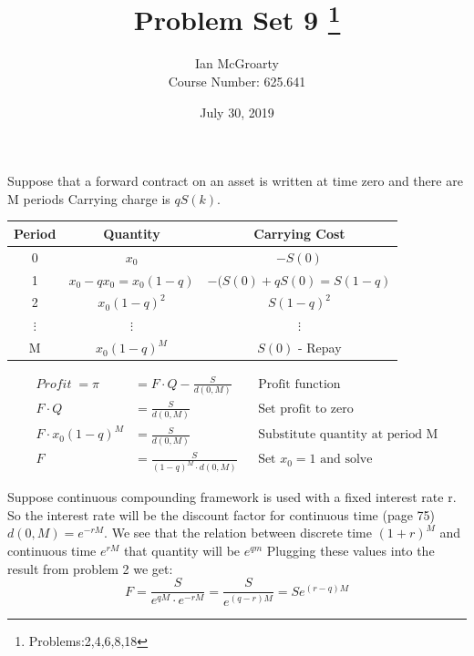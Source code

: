 \documentclass[12pt]{article}
\title{Problem Set 9 \thanks{Problems:2,4,6,8,18}}
\author{Ian McGroarty \\
	Course Number: 625.641}
\date{July 30, 2019}
\newenvironment{problem}[3][Problem]{\begin{trivlist}
\item[\hskip \labelsep {\bfseries #1}\hskip \labelsep {\bfseries #2.}]}{\end{trivlist}}
\begin{document}
\maketitle
\newpage
\begin{problem}{2 (Proportional Carrying Charges)}. Suppose that a forward contract on an asset is written at time zero and there are M periods Carrying charge is $qS(k)$. 
\begin{center}
\begin{tabular}{c|c|c}
Period & Quantity & Carrying Cost \\ 
\hline
0 & $x_0 $ & $-S(0)$ \\ 
1  & $x_0 - qx_0 = x_0(1-q)$ & $-(S(0) + qS(0)= S(1-q)$ \\ 
2 & $x_0(1-q)^2 $ & $S(1-q)^2$ \\ 
$\vdots $ & $\vdots $ & $\vdots $ \\
 M & $x_0(1-q)^M $ & $S(0)$ - Repay 
\end{tabular}
\end{center}
\begin{align*}
Profit \; = \pi &= F\cdot Q - \frac{S }{d(0,M)}  && \text{Profit function} \\
F\cdot Q &= \frac{S }{d(0,M)} && \text{Set profit to zero} \\
F \cdot x_0(1-q)^M & = \frac{S}{d(0,M)} && \text{Substitute quantity at period M} \\
F &= \frac{S}{(1-q)^M \cdot d(0,M)} && \text{Set $x_0=1$ and solve} 
\end{align*}
  \end{problem}
\newpage
\begin{problem}{4 (Continuous time Carrying Charge)}. Suppose continuous compounding framework is used with a fixed interest rate r. \\
So the interest rate will be the discount factor for continuous time (page 75) $d(0,M) = e^{-rM}$. We see that the relation between discrete time $(1+r)^M$ and continuous time $e^{rM}$ that quantity will be $e^{qm}$ Plugging these values into the result from problem 2 we get: $$ F= \frac{S}{e^{qM} \cdot e^{-rM}} = \frac{S}{e^{(q-r)M}} = Se^{(r-q)M} $$
\end{problem}
\end{document}
